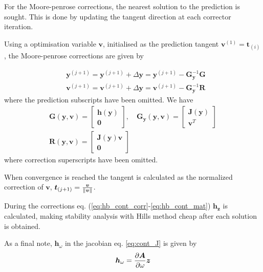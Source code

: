 For the Moore-penrose corrections, the nearest solution to the prediction is
sought. This is done by updating the tangent direction at each corrector
iteration.

Using a optimisation variable $\bm v$, initialised as the prediction tangent
$\bm v^{(1)} = \bm t_{(i)}$, the Moore-penrose corrections are given by

\begin{equation}
  \label{eq:hb_cont_corr}
  \begin{aligned}
    &\bm y^{(j+1)} = \bm y^{(j+1)} + \Delta \bm y =
    \bm y^{(j+1)} -\bm G^{-1}_{\bm y} \bm G \\
    &\bm v^{(j+1)} = \bm v^{(j+1)} + \Delta \bm y =
    \bm v^{(j+1)} -\bm G^{-1}_{\bm y} \bm R
  \end{aligned}
\end{equation}
where the prediction subscripts have been omitted. We have
\begin{equation}
  \label{eq:hb_cont_mat}
  \begin{gathered}
    \bm G(\bm y, \bm v) =
    \begin{bmatrix}
      \bm h(\bm y) \\ \bm 0
    \end{bmatrix}, \quad
    \bm G_{\bm y}(\bm y, \bm v) =
    \begin{bmatrix}
      \bm J(\bm y) \\ \bm v^T
    \end{bmatrix} \\
      \bm R(\bm y, \bm v) =
  \begin{bmatrix}
    \bm J(\bm y) \bm v \\ \bm 0
  \end{bmatrix}
  \end{gathered}
\end{equation}
where correction superscripts have been omitted.

When convergence is reached the tangent is calculated as the normalized
correction of $\bm v$, $\bm t_{(j+1)} = \frac{\bm v}{\left\lVert \bm v \right\rVert}$.

During the corrections eq. (\ref{eq:hb_cont_corr}-\ref{eq:hb_cont_mat}) $\bm h_{\bm
  z}$ is calculated, making stability analysis with Hills method cheap after
each solution is obtained.

As a final note, $\bm h_\omega$ in the jacobian eq. \eqref{eq:cont_J} is given by
\begin{equation}
  \label{eq:hb_cont_Hw}
  \bm h_\omega = \frac{\partial \bm A}{\partial \omega} \bm z
\end{equation}

